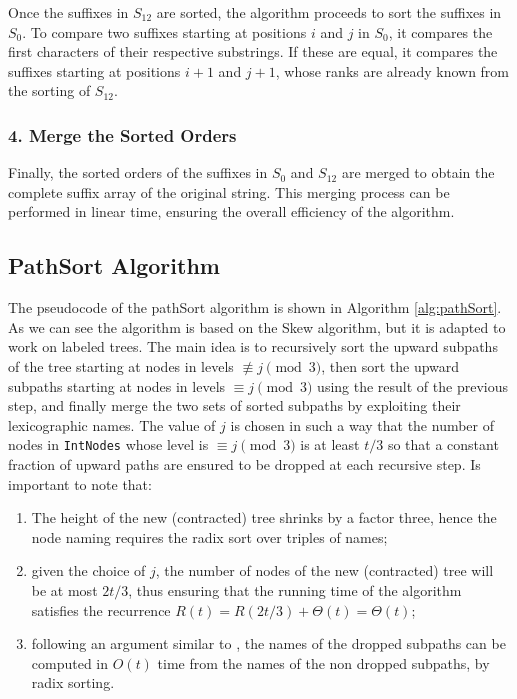 Once the suffixes in $S_{12}$ are sorted, the algorithm proceeds to sort the suffixes in $S_0$. To compare two suffixes starting at positions $i$ and $j$ in $S_0$, it compares the first characters of their respective substrings. If these are equal, it compares the suffixes starting at positions $i+1$ and $j+1$, whose ranks are already known from the sorting of $S_{12}$.

\subsubsection*{4. Merge the Sorted Orders}

Finally, the sorted orders of the suffixes in $S_0$ and $S_{12}$ are merged to obtain the complete suffix array of the original string. This merging process can be performed in linear time, ensuring the overall efficiency of the algorithm.

\subsection{PathSort Algorithm}

The pseudocode of the pathSort algorithm is shown in Algorithm \ref{alg:pathSort}. As we can see the algorithm is based on the Skew algorithm, but it is adapted to work on labeled trees. The main idea is to recursively sort the upward subpaths of the tree starting at nodes in levels $\not\equiv j \pmod{3}$, then sort the upward subpaths starting at nodes in levels $\equiv j \pmod{3}$ using the result of the previous step, and finally merge the two sets of sorted subpaths by exploiting their lexicographic names. The value of $j$ is chosen in such a way that the number of nodes in \texttt{IntNodes} whose level is $\equiv j \pmod{3}$ is at least $t/3$ so that a constant fraction of upward paths are ensured to be dropped at each recursive step. Is important to note that:
\begin{enumerate}
    \item The height of the new (contracted) tree shrinks by a factor three, hence the node naming requires the radix sort over triples of names; 
    \item given the choice of $j$, the number of nodes of the new (contracted) tree will be at most $2t/3$, thus ensuring that the running time of the algorithm satisfies the recurrence $R(t) = R(2t/3) + \Theta(t) = \Theta(t)$; 
    \item following an argument similar to \cite{karkkainen2006linear}, the names of the dropped subpaths can be computed in $O(t)$ time from the names of the non dropped subpaths, by radix sorting.
\end{enumerate}

